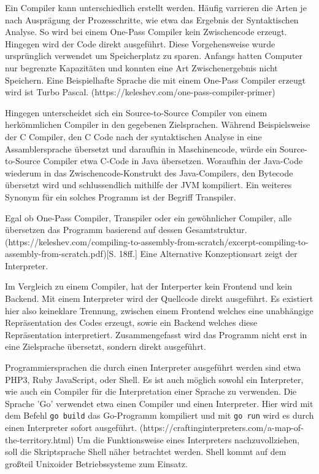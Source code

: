 
Ein Compiler kann unterschiedlich erstellt werden. Häufig varrieren die Arten je nach Ausprägung der Prozesschritte, wie etwa das Ergebnis der Syntaktischen Analyse.
So wird bei einem One-Pass Compiler kein Zwischencode erzeugt. Hingegen wird der Code direkt ausgeführt. Diese Vorgehensweise wurde ursprünglich verwendet um Speicherplatz zu sparen. 
Anfangs hatten Computer nur begrenzte Kapazitäten und konnten eine Art Zwischenergebnis nicht Speichern. Eine Beispielhafte Sprache die mit einem One-Pass Compiler erzeugt wird ist Turbo Pascal. (https://keleshev.com/one-pass-compiler-primer)

Hingegen unterscheidet sich ein Source-to-Source Compiler von einem herkömmlichen Compiler in den gegebenen Zielsprachen. Während Beispielsweise der C Compiler, den C Code nach der syntaktischen Analyse in eine Assamblersprache übersetzt und daraufhin in Maschinencode, würde ein Source-to-Source Compiler etwa C-Code in Java übersetzen. Woraufhin der Java-Code wiederum in das Zwischencode-Konstrukt des Java-Compilers, den Bytecode übersetzt wird und schlussendlich mithilfe der JVM kompiliert. 
Ein weiteres Synonym für ein solches Programm ist der Begriff Transpiler.

Egal ob One-Pass Compiler, Transpiler oder ein gewöhnlicher Compiler, alle übersetzen das Programm basierend auf dessen Gesamtstruktur. (https://keleshev.com/compiling-to-assembly-from-scratch/excerpt-compiling-to-assembly-from-scratch.pdf)[S. 18ff.] Eine Alternative Konzeptionsart zeigt der Interpreter.


Im Vergleich zu einem Compiler, hat der Interperter kein Frontend und kein Backend. Mit einem Interpreter wird der Quellcode direkt ausgeführt. Es existiert hier also keineklare Trennung, zwischen einem Frontend welches eine unabhängige Repräsentation des Codes erzeugt, sowie ein Backend welches diese Repräsentation interpretiert. Zusammengefasst wird das Programm nicht erst in eine Zielsprache übersetzt, sondern direkt ausgeführt.

Programmiersprachen die durch einen Interpreter ausgeführt werden sind etwa PHP3, Ruby JavaScript, oder Shell. Es ist auch möglich sowohl ein Interpreter, wie auch ein Compiler für die Interpretation einer Sprache zu verwenden. 
Die Sprache 'Go' verwendet etwa einen Compiler und einen Interpreter. Hier wird mit dem Befehl \verb+go build+ das Go-Programm kompiliert und mit \verb+go run+ wird es durch einen Interpreter sofort ausgeführt. (https://craftinginterpreters.com/a-map-of-the-territory.html)
Um die Funktionsweise eines Interpreters nachzuvollziehen, soll die Skriptsprache Shell näher betrachtet werden. Shell kommt auf dem großteil Unixoider Betriebssysteme zum Einsatz.
  
